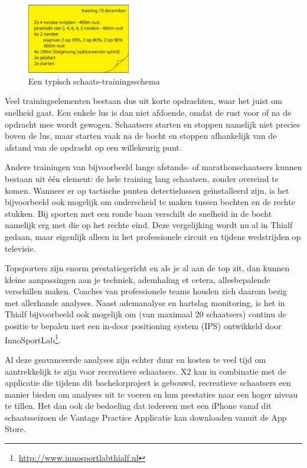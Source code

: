 \begin{figure}[H]
  \begin{center}
    \includegraphics[width=0.4\textwidth]{style/images/training}
  \end{center}
  \caption{Een typisch schaats-trainingsschema}
  \label{fig:training}
\end{figure}

Veel trainingselementen bestaan dus uit korte opdrachten, waar het juist om snelheid gaat. Een enkele lus is dan niet afdoende, omdat de rust voor of na de opdracht mee wordt gewogen. Schaatsers starten en stoppen namelijk niet precies boven de lus, maar starten vaak na de bocht en stoppen afhankelijk van de afstand van de opdracht op een willekeurig punt. 

Andere trainingen van bijvoorbeeld lange afstands- of marathonschaatsers kunnen bestaan uit één element: de hele training lang schaatsen, zonder overeind te komen. Wanneer er op tactische punten detectielussen geïnstalleerd zijn, is het bijvoorbeeld ook mogelijk om onderscheid te maken tussen bochten en de rechte stukken. Bij sporten met een ronde baan verschilt de snelheid in de bocht namelijk erg met die op het rechte eind. Deze vergelijking wordt nu al in Thialf gedaan, maar eigenlijk alleen in het professionele circuit en tijdens wedstrijden op televisie.

Topsporters zijn enorm prestatiegericht en als je al aan de top zit, dan kunnen kleine aanpassingen aan je techniek, ademhaling et cetera, allesbepalende verschillen maken. Coaches van professionele teams houden zich daarom bezig met allerhande analyses. Naast ademanalyse en hartslag monitoring, is het in Thialf bijvoorbeeld ook mogelijk om (van maximaal 20 schaatsers) continu de positie te bepalen met een in-door positioning system (IPS) ontwikkeld door InnoSportLab\footnote{\url{http://www.innosportlabthialf.nl}}.

Al deze geavanceerde analyses zijn echter duur en kosten te veel tijd om aantrekkelijk te zijn voor recreatieve schaatsers. \mylaps X2 kan in combinatie met de applicatie die tijdens dit bachelorproject is gebouwd, recreatieve schaatsers een manier bieden om analyses uit te voeren en hun prestaties naar een hoger niveau te tillen. Het dan ook de bedoeling dat iedereen met een iPhone vanaf dit schaatsseizoen de Vantage Practice Applicatie kan downloaden vanuit de App Store.

